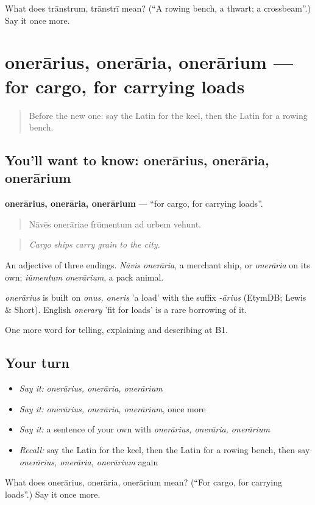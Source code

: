\begin{tcolorbox}[breakable,colback=teal!4,colframe=teal!35!black,title={Before you move on}]
What does trānstrum, trānstrī mean? (\textquotedblleft{}A rowing bench, a thwart; a crossbeam\textquotedblright{}.) Say it once more.
\end{tcolorbox}
\section[onerārius, onerāria, onerārium]{onerārius, onerāria, onerārium — for cargo, for carrying loads}

\label{lesson:LA-C436-onerarius}



\begin{quote}
Before the new one: say the Latin for the keel, then the Latin for a rowing bench.
\end{quote}

\subsection*{You'll want to know: onerārius, onerāria, onerārium}
\textbf{onerārius, onerāria, onerārium} — \textquotedblleft{}for cargo, for carrying loads\textquotedblright{}.

\begin{quote}
Nāvēs onerāriae frūmentum ad urbem vehunt.
\end{quote}

\begin{quote}
\emph{Cargo ships carry grain to the city.}
\end{quote}

An adjective of three endings. \emph{Nāvis onerāria}, a merchant ship, or \emph{onerāria} on its own; \emph{iūmentum onerārium}, a pack animal.

\begin{cousinweb}
\emph{onerārius} is built on \emph{onus, oneris} 'a load' with the suffix \emph{-ārius} (EtymDB; Lewis \& Short). English \emph{onerary} 'fit for loads' is a rare borrowing of it.
\end{cousinweb}

\begin{grammarlens}[title={What you've built}]
One more word for telling, explaining and describing at B1.
\end{grammarlens}

\subsection*{Your turn}
\begin{itemize}
\raggedright
  \item \emph{Say it:} \emph{onerārius, onerāria, onerārium}
  \item \emph{Say it:} \emph{onerārius, onerāria, onerārium}, once more
  \item \emph{Say it:} a sentence of your own with \emph{onerārius, onerāria, onerārium}
  \item \emph{Recall:} say the Latin for the keel, then the Latin for a rowing bench, then say \emph{onerārius, onerāria, onerārium} again
\end{itemize}

\begin{tcolorbox}[breakable,colback=teal!4,colframe=teal!35!black,title={Before you move on}]
What does onerārius, onerāria, onerārium mean? (\textquotedblleft{}For cargo, for carrying loads\textquotedblright{}.) Say it once more.
\end{tcolorbox}
